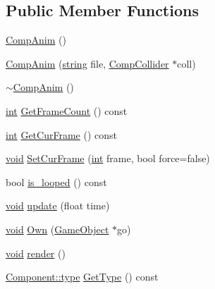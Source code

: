 \subsection*{Public Member Functions}
\begin{DoxyCompactItemize}
\item 
\hyperlink{class_comp_anim_a91bd2d2bea5082f5f74635f12d4f276a}{Comp\-Anim} ()
\item 
\hyperlink{class_comp_anim_a846147b0dcfbb51ad8ab936797e2cf6a}{Comp\-Anim} (\hyperlink{_s_d_l__opengl__glext_8h_ae84541b4f3d8e1ea24ec0f466a8c568b}{string} file, \hyperlink{class_comp_collider}{Comp\-Collider} $\ast$coll)
\item 
\hyperlink{class_comp_anim_ac1b228a3161bf42d98193aebf70b7779}{$\sim$\-Comp\-Anim} ()
\item 
\hyperlink{_s_d_l__thread_8h_a6a64f9be4433e4de6e2f2f548cf3c08e}{int} \hyperlink{class_comp_anim_a3e6cc4751dbfca6e943fc4fceb6f507b}{Get\-Frame\-Count} () const 
\item 
\hyperlink{_s_d_l__thread_8h_a6a64f9be4433e4de6e2f2f548cf3c08e}{int} \hyperlink{class_comp_anim_a27cac4515350597b66a6e46242e39eea}{Get\-Cur\-Frame} () const 
\item 
\hyperlink{_s_d_l__opengles2__gl2ext_8h_ae5d8fa23ad07c48bb609509eae494c95}{void} \hyperlink{class_comp_anim_ab3167e189c39d976a4474874b0b2b168}{Set\-Cur\-Frame} (\hyperlink{_s_d_l__thread_8h_a6a64f9be4433e4de6e2f2f548cf3c08e}{int} frame, bool force=false)
\item 
bool \hyperlink{class_comp_anim_ac6bd76a5091dac4a91966773330c31d1}{is_looped} () const 
\item 
\hyperlink{_s_d_l__opengles2__gl2ext_8h_ae5d8fa23ad07c48bb609509eae494c95}{void} \hyperlink{class_comp_anim_ac2e2e27fe70b13a8cce4f8a1df792e59}{update} (float time)
\item 
\hyperlink{_s_d_l__opengles2__gl2ext_8h_ae5d8fa23ad07c48bb609509eae494c95}{void} \hyperlink{class_comp_anim_a41d7df3049e9cf1db1d8f00cbaf73062}{Own} (\hyperlink{class_game_object}{Game\-Object} $\ast$go)
\item 
\hyperlink{_s_d_l__opengles2__gl2ext_8h_ae5d8fa23ad07c48bb609509eae494c95}{void} \hyperlink{class_comp_anim_a5a453e9ac658863696c3db745e6fc0bf}{render} ()
\item 
\hyperlink{class_component_ad6d161b6acf7b843b55bb9feac7af71a}{Component\-::type} \hyperlink{class_comp_anim_af25364111916fa6b5841d039d696295f}{Get\-Type} () const 
\end{DoxyCompactItemize}
